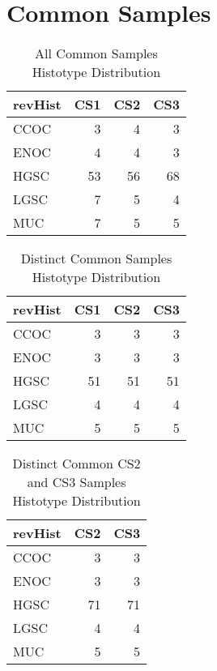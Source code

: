 \documentclass[
]{report}
\begin{document}
\hypertarget{common-samples}{%
\section{Common Samples}\label{common-samples}}

\begin{table}

\caption{\label{tab:common-dist-all}All Common Samples Histotype Distribution}
\centering
\begin{tabular}[t]{l|r|r|r}
\hline
revHist & CS1 & CS2 & CS3\\
\hline
CCOC & 3 & 4 & 3\\
\hline
ENOC & 4 & 4 & 3\\
\hline
HGSC & 53 & 56 & 68\\
\hline
LGSC & 7 & 5 & 4\\
\hline
MUC & 7 & 5 & 5\\
\hline
\end{tabular}
\end{table}

\begin{table}

\caption{\label{tab:common-dist-distinct}Distinct Common Samples Histotype Distribution}
\centering
\begin{tabular}[t]{l|r|r|r}
\hline
revHist & CS1 & CS2 & CS3\\
\hline
CCOC & 3 & 3 & 3\\
\hline
ENOC & 3 & 3 & 3\\
\hline
HGSC & 51 & 51 & 51\\
\hline
LGSC & 4 & 4 & 4\\
\hline
MUC & 5 & 5 & 5\\
\hline
\end{tabular}
\end{table}

\begin{table}

\caption{\label{tab:common-cs2-cs3-dist-distinct}Distinct Common CS2 and CS3 Samples Histotype Distribution}
\centering
\begin{tabular}[t]{l|r|r}
\hline
revHist & CS2 & CS3\\
\hline
CCOC & 3 & 3\\
\hline
ENOC & 3 & 3\\
\hline
HGSC & 71 & 71\\
\hline
LGSC & 4 & 4\\
\hline
MUC & 5 & 5\\
\hline
\end{tabular}
\end{table}
\end{document}

